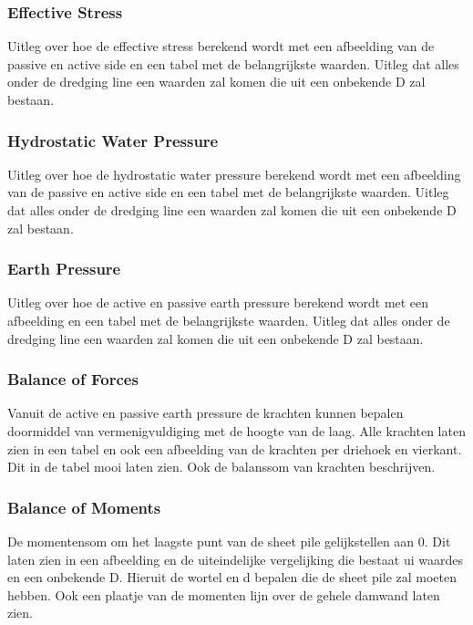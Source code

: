 \subsubsection{Effective Stress}

Uitleg over hoe de effective stress berekend wordt met een afbeelding van de passive en active side en een tabel met de belangrijkste waarden. Uitleg dat alles onder de dredging line een waarden zal komen die uit een onbekende D zal bestaan.

\subsubsection{Hydrostatic Water Pressure}

Uitleg over hoe de hydrostatic water pressure berekend wordt met een afbeelding van de passive en active side en een tabel met de belangrijkste waarden. Uitleg dat alles onder de dredging line een waarden zal komen die uit een onbekende D zal bestaan.


\subsubsection{Earth Pressure}

Uitleg over hoe de active en passive earth pressure berekend wordt met een afbeelding en een tabel met de belangrijkste waarden. Uitleg dat alles onder de dredging line een waarden zal komen die uit een onbekende D zal bestaan. 

\subsubsection{Balance of Forces}

Vanuit de active en passive earth pressure de krachten kunnen bepalen doormiddel van vermenigvuldiging met de hoogte van de laag. Alle krachten laten zien in een tabel en ook een afbeelding van de krachten per driehoek en vierkant. Dit in de tabel mooi laten zien. Ook de balanssom van krachten beschrijven.

\subsubsection{Balance of Moments}

De momentensom om het laagste punt van de sheet pile gelijkstellen aan 0. Dit laten zien in een afbeelding en de uiteindelijke vergelijking die bestaat ui waardes en een onbekende D. Hieruit de wortel en d bepalen die de sheet pile zal moeten hebben. Ook een plaatje van de momenten lijn over de gehele damwand laten zien.

